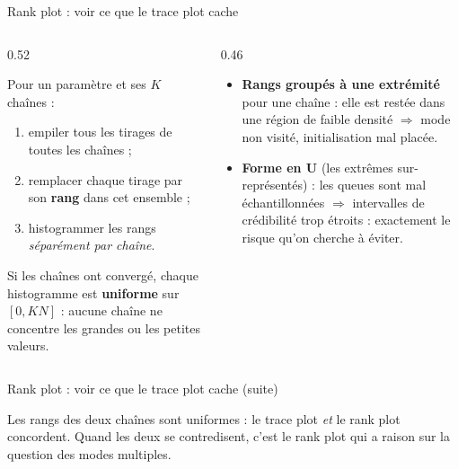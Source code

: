 \begin{frame}{Rank plot : voir ce que le trace plot cache}
\begin{columns}[t]
\begin{column}{0.52\textwidth}
\begin{ebox}[Construction]
Pour un paramètre et ses $K$ chaînes :
\begin{enumerate}
  \item empiler tous les tirages de toutes les chaînes ;
  \item remplacer chaque tirage par son \textbf{rang} dans cet ensemble ;
  \item histogrammer les rangs \emph{séparément par chaîne}.
\end{enumerate}
Si les chaînes ont convergé, chaque histogramme est \textbf{uniforme} sur
$[0, KN]$ : aucune chaîne ne concentre les grandes ou les petites valeurs.
\end{ebox}
\end{column}
\begin{column}{0.46\textwidth}
\begin{kbox}
\begin{itemize}
  \item \textbf{Rangs groupés à une extrémité} pour une chaîne : elle est restée
        dans une région de faible densité $\Rightarrow$ mode non visité,
        initialisation mal placée.
  \item \textbf{Forme en U} (les extrêmes sur-représentés) : les queues sont mal
        échantillonnées $\Rightarrow$ intervalles de crédibilité trop étroits :
        exactement le risque qu'on cherche à éviter.
\end{itemize}
\end{kbox}
\end{column}
\end{columns}
\end{frame}

\begin{frame}{Rank plot : voir ce que le trace plot cache (suite)}
\begin{solbox}
Les rangs des deux chaînes sont uniformes : le trace plot \emph{et} le rank plot
concordent. Quand les deux se contredisent, c'est le rank plot qui a raison sur
la question des modes multiples.
\end{solbox}

\end{frame}

